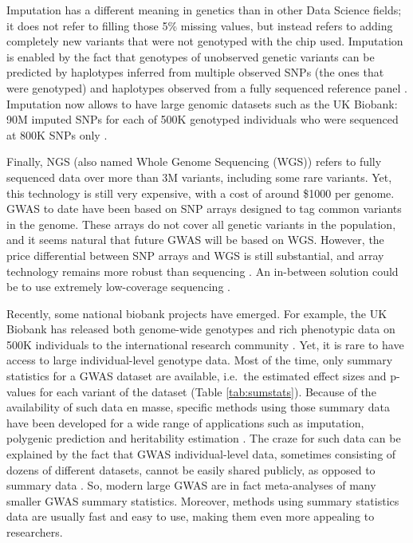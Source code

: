 Imputation has a different meaning in genetics than in other Data Science fields; it does not refer to filling those 5\% missing values, but instead refers to adding completely new variants that were not genotyped with the chip used. 
Imputation is enabled by the fact that genotypes of unobserved genetic variants can be predicted by haplotypes inferred from multiple observed SNPs (the ones that were genotyped) and haplotypes observed from a fully sequenced reference
panel \cite[]{marchini2010genotype,mccarthy2016reference}.
Imputation now allows to have large genomic datasets such as the UK Biobank: 90M imputed SNPs for each of 500K genotyped individuals who were sequenced at 800K SNPs only \cite[]{bycroft2017genome}.

Finally, NGS (also named Whole Genome Sequencing (WGS)) refers to fully sequenced data over more than 3M variants, including some rare variants. Yet, this technology is still very expensive, with a cost of around \$1000 per genome.
GWAS to date have been based on SNP arrays designed to tag common variants in the genome. These arrays do not cover all genetic variants in the population, and it seems natural that future GWAS will be based on WGS. However, the price differential between SNP arrays and WGS is still substantial, and array technology remains more robust than sequencing \cite[]{visscher201710}. An in-between solution could be to use extremely low-coverage sequencing \cite[]{pasaniuc2012extremely}.

Recently, some national biobank projects have emerged. For example, the UK Biobank has released both genome-wide genotypes and rich phenotypic data on 500K individuals to the international research community \cite[]{bycroft2017genome}.
Yet, it is rare to have access to large individual-level genotype data. 
Most of the time, only summary statistics for a GWAS dataset are available, i.e.\ the estimated effect sizes and p-values for each variant of the dataset (Table \ref{tab:sumstats}). Because of the availability of such data en masse, specific methods using those summary data have been developed for a wide range of applications such as imputation, polygenic prediction and heritability estimation \cite[]{pasaniuc2014fast,vilhjalmsson2015modeling,bulik2015ld,pasaniuc2017dissecting,speed2018sumher}. The craze for such data can be explained by the fact that GWAS individual-level data, sometimes consisting of dozens of different datasets, cannot be easily shared publicly, as opposed to summary data \cite[]{lin2010meta}.
So, modern large GWAS are in fact meta-analyses of many smaller GWAS summary statistics.
Moreover, methods using summary statistics data are usually fast and easy to use, making them even more appealing to researchers.

